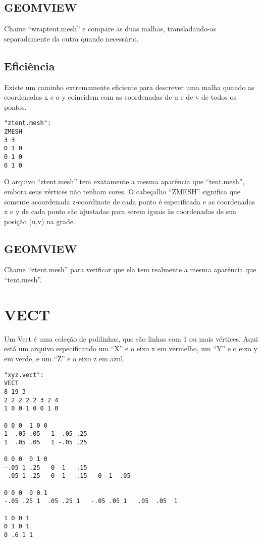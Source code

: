 \documentclass[12pt,a4paper]{book}
\begin{document}
\section{GEOMVIEW}

Chame ``wraptent.mesh'' e compare as duas malhas, transladando-as
separadamente da outra quando necessário.

\section{Eficiência}

Existe um caminho extremamente eficiente para descrever uma malha quando as coordenadas
x e o y coincidem com as coordenadas de u e de v de todos os pontos.

\begin{verbatim}
"ztent.mesh":
ZMESH
3 3
0 1 0
0 1 0
0 1 0
\end{verbatim}

O arquivo ``ztent.mesh'' tem exatamente a mesma aparência que ``tent.mesh'', embora seus
vértices não tenham cores. O cabeçalho ``ZMESH'' significa que somente
acoordenada z-coordinate de cada ponto é especificada e as coordenadas
x e y de cada ponto são ajustadas para serem iguais às coordenadas de sua posição (u,v) na
grade.

\section{GEOMVIEW}

Chame ``ztent.mesh'' para verificar que ela tem realmente a mesma aparência que ``tent.mesh''.

\chapter{VECT}

Um Vect é uma coleção de polilinhas, que são linhas com 1 ou mais
vértices. Aqui está um arquivo especificando um ``X'' e o eixo x em vermelho, um ``Y''
e o eixo y em verde, e um ``Z'' e o eixo z em azul.

\begin{verbatim}
"xyz.vect":
VECT
8 19 3
2 2 2 2 2 3 2 4 
1 0 0 1 0 0 1 0

0 0 0  1 0 0
1 -.05 .05   1  .05 .25
1  .05 .05   1 -.05 .25

0 0 0  0 1 0
-.05 1 .25   0  1   .15
 .05 1 .25   0  1   .15   0  1  .05

0 0 0  0 0 1
-.05 .25 1  .05 .25 1   -.05 .05 1   .05  .05  1

1 0 0 1
0 1 0 1
0 .6 1 1
\end{verbatim}
\end{document}
